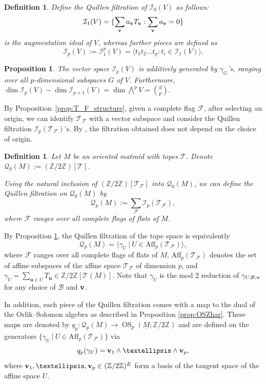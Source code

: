 \documentclass{amsart}
\newtheorem{proposition}[theorem]{Proposition}
\newtheorem{definition}[theorem]{Definition}
\newcommand\Fcal{{\mathcal F}}
\newcommand\Ical{{\mathcal I}}
\newcommand\Qcal{{\mathcal Q}}
\newcommand\Tcal{{\mathcal T}}
\newcommand\vv{{\bf v}}
\newcommand\ZZ{{\mathbb Z}}
\newcommand\Ztwo{{\mathbb Z}/2{\mathbb Z}}
\newcommand\qbv{{q}}
\DeclareMathOperator{\OS}{OS}
\begin{document}
{\begin{definition}
Define the {\em Quillen filtration} of $\Ical_0(V)$ as follows: $$\Ical_1(V) = \{\sum_\vv a_\vv T_\vv: \sum_\vv a_\vv=0\}$$ is the {\em augmentation ideal} of $V$, whereas further pieces are defined as $$\Ical_p(V):=\Ical_1^p(V)=\langle t_1 t_2\ldots t_p: t_i\in\Ical_1(V)\rangle.$$
\end{definition}

\begin{proposition} \cite[Lemma~4.1 and Proposition~4.3]{RS} \label{prop:SS_generate_Quillen}
The vector space $\Ical_p(V)$ is additively generated by $\gamma_G$'s, ranging over all $p$-dimensional subspaces $G$ of $V$.
Furthermore, $\dim\Ical_p(V) - \dim\Ical_{p+1}(V) = \dim\bigwedge^p V = \binom{d}{p}$.
\end{proposition}

By Proposition~\ref{prop:T_F_structure}, given a complete flag $\Fcal$, after selecting an origin, we can identify $\Tcal_\Fcal$ with a vector subspace and consider the Quillen filtration $\Ical_p(\Tcal_\Fcal)$'s.
By \cite[Lemma~4.4]{RS}, the filtration obtained does not depend on the choice of origin. 

\begin{definition}
Let $M$ be an oriented matroid with topes $\Tcal$.
Denote $\Qcal_0(M):=(\ZZ/2\ZZ)[\Tcal]$. 

Using the natural inclusion of $(\ZZ/2\ZZ)[\Tcal_\Fcal]$ into $\Qcal_0(M)$, we can define the Quillen filtration on $\Qcal_0(M)$ by $$\Qcal_p(M):=\sum_\Fcal \Ical_p(\Tcal_\Fcal),$$
where $\Fcal$ ranges over all complete flags of flats of $M$.
\end{definition}

By Proposition \ref{prop:SS_generate_Quillen}, the Quillen filtration of the tope space is equivalently
$$\Qcal_p(M) = \langle \gamma_{ U} \ | \ U \in \text{Aff}_p(\Tcal_{\Fcal}) \rangle,$$
where $\Fcal$ ranges over all complete flags of flats of $M$, $\text{Aff}_p(\Tcal_{\Fcal})$ denotes the set of affine subspaces of the affine space $\Tcal_{\Fcal}$
 of dimension $p$, and $\gamma_U =\sum_{\mathbf{u} \in U} T_{\mathbf{u}} \in \Ztwo[\Tcal(M)]$. 
 Note that $\gamma_U$ is the mod $2$ reduction of $\gamma_{U, \mathcal{B}, \vv}$ for any choice of $\mathcal{B}$ and $\vv$.

 In addition, each piece of the Quillen filtration comes with a map to the dual of the Orlik--Solomon algebra as described in Proposition \ref{prop:OSZhar}. These maps are denoted by $\qbv_p \colon \Qcal_p(M) \to \OS_p(\underline{M}; \Ztwo)$ and are defined on the generators 
 $\{\gamma_{ U} \ | \ U \in \text{Aff}_p(\Tcal_{\Fcal}) \} $
 via 
 \begin{equation} \label{eq:defqp} 
 \qbv_p(\gamma_{ U}) = \vv_1 \wedge \dots \wedge \vv_p, 
 \end{equation}
 where $\vv_1, \dots, \vv_p \in (\ZZ/2\ZZ)^E$ form a basis of the tangent space of the affine space $U$.


}
\end{document}
